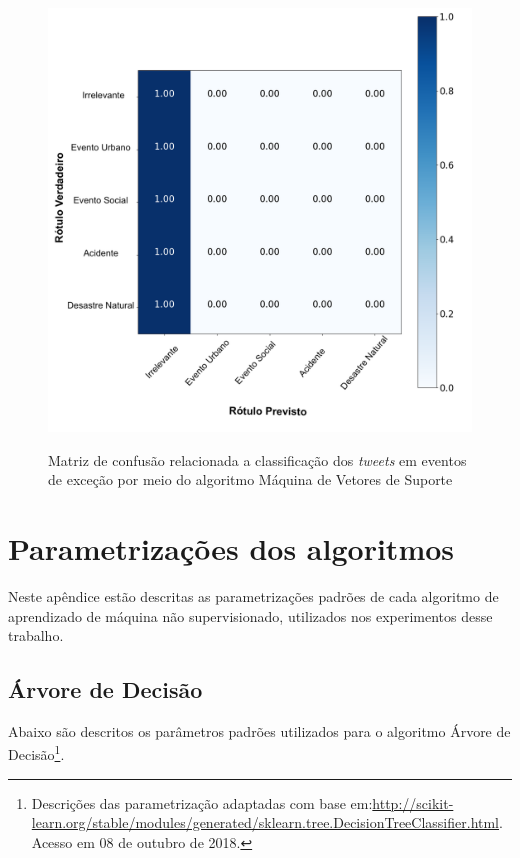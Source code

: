 \documentclass[
	12pt,				%
	oneside,			%
	a4paper,			%
	english,			%
	brazil				%
	]{abntex2ppgsi}
\begin{document}
{{{\begin{apendicesenv}
\begin{figure}[!htb]
	\centering
 	  \caption{Matriz de confusão relacionada a classificação dos \textit{tweets} em eventos de exceção por meio do algoritmo Máquina de Vetores de Suporte}
		\includegraphics[width=1\linewidth]{images/confusion_matrix_svm_pt.png}
	\label{fig:confusion_matrix_svm}
\end{figure}

\chapter{Parametrizações dos algoritmos}
\label{apendiceF}

Neste apêndice estão descritas as parametrizações padrões de cada algoritmo de aprendizado de máquina não supervisionado, utilizados nos experimentos desse trabalho.

\section{Árvore de Decisão}

Abaixo são descritos os parâmetros padrões utilizados para o algoritmo Árvore de Decisão\footnote{Descrições das parametrização adaptadas com base em:\url{http://scikit-learn.org/stable/modules/generated/sklearn.tree.DecisionTreeClassifier.html}. Acesso em 08 de outubro de 2018.}.


\end{apendicesenv}}}}
\end{document}
